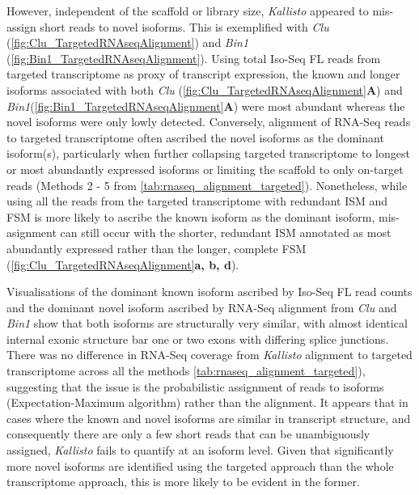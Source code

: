 However, independent of the scaffold or library size, \textit{Kallisto} appeared to mis-assign short reads to novel isoforms. This is exemplified with \textit{Clu} (\cref{fig:Clu_TargetedRNAseqAlignment}) and \textit{Bin1} (\cref{fig:Bin1_TargetedRNAseqAlignment}).   Using total Iso-Seq FL reads from targeted transcriptome as proxy of transcript expression, the known and longer isoforms associated with both \textit{Clu} (\cref{fig:Clu_TargetedRNAseqAlignment}\textbf{A}) and \textit{Bin1}(\cref{fig:Bin1_TargetedRNAseqAlignment}\textbf{A}) were most abundant whereas the novel isoforms were only lowly detected. Conversely, alignment of RNA-Seq reads to targeted transcriptome often ascribed the novel isoforms as the dominant isoform(s), particularly when further collapsing targeted transcriptome to longest or most abundantly expressed isoforms or limiting the scaffold to only on-target reads (Methods 2 - 5 from \cref{tab:rnaseq_alignment_targeted}). Nonetheless, while using all the reads from the targeted transcriptome with redundant ISM and FSM is more likely to ascribe the known isoform as the dominant isoform, mis-asignment can still occur with the shorter, redundant ISM annotated as most abundantly expressed rather than the longer, complete FSM (\cref{fig:Clu_TargetedRNAseqAlignment}\textbf{a, b, d}).

Visualisations of the dominant known isoform ascribed by Iso-Seq FL read counts and the dominant novel isoform ascribed by RNA-Seq alignment from \textit{Clu} and \textit{Bin1} show that both isoforms are structurally very similar, with almost identical internal exonic structure bar one or two exons with differing splice junctions. There was no difference in RNA-Seq coverage from \textit{Kallisto} alignment to targeted transcriptome across all the methods \cref{tab:rnaseq_alignment_targeted}), suggesting that the issue is the probabilistic assignment of reads to isoforms (Expectation-Maximum algorithm) rather than the alignment. It appears that in cases where the known and novel isoforms are similar in transcript structure, and consequently there are only a few short reads that can be unambiguously assigned, \textit{Kallisto} fails to quantify at an isoform level. Given that significantly more novel isoforms are identified using the targeted approach than the whole transcriptome approach, this is more likely to be evident in the former.   



